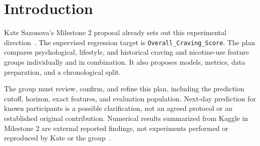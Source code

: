 \section{Introduction}
Kate Sazonova's Milestone 2 proposal already sets out this experimental
direction~\cite[pp.~13--14]{proposal}. The supervised regression target is
\texttt{Overall\_Craving\_Score}. The plan compares psychological, lifestyle,
and historical craving and nicotine-use feature groups individually and in
combination. It also proposes models, metrics, data preparation, and a
chronological split.

The group must review, confirm, and refine this plan, including the prediction
cutoff, horizon, exact features, and evaluation population. Next-day prediction
for known participants is a possible clarification, not an agreed protocol or
an established original contribution. Numerical results summarized from Kaggle
in Milestone 2 are external reported findings, not experiments performed or
reproduced by Kate or the group~\cite[pp.~4--13]{proposal}.


